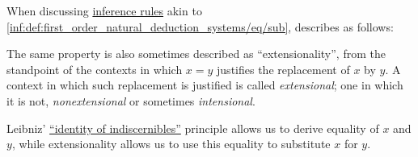 \begin{concept}\label{con:extensionality}
  When discussing \hyperref[def:inference_rule]{inference rules} akin to \ref{inf:def:first_order_natural_deduction_systems/eq/sub},  describes  as follows:
  \begin{displayquote}
    The same property is also sometimes described as \enquote{extensionality}, from the standpoint of the contexts in which \( x = y \) justifies the replacement of \( x \) by \( y \). A context in which such replacement is justified is called \textit{extensional}; one in which it is not, \textit{nonextensional} or sometimes \textit{intensional}.
  \end{displayquote}
\end{concept}
\begin{comments}
  \item Leibniz' \hyperref[rem:identity_of_indiscernibles]{\enquote{identity of indiscernibles}} principle allows us to derive equality of \( x \) and \( y \), while extensionality allows us to use this equality to substitute \( x \) for \( y \).
\end{comments}

